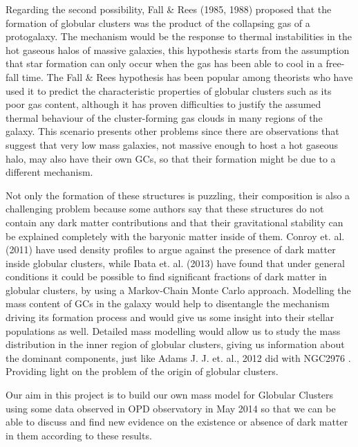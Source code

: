 Regarding the second possibility, Fall \& Rees (1985, 1988) proposed that the formation of globular clusters was the product of the collapsing gas of a protogalaxy. The mechanism would be the response to thermal instabilities in the hot gaseous halos of massive galaxies, this hypothesis starts from the assumption that star formation can only occur when the gas has been able to cool in a free-fall time. The Fall \& Rees hypothesis has been popular among theorists who have used it to predict the characteristic properties of globular clusters such as its poor gas content, although it has proven difficulties to justify the assumed thermal behaviour of the cluster-forming gas clouds in many regions of the galaxy. This scenario presents other problems since there are observations that suggest that very low mass galaxies, not massive enough to host a hot gaseous halo, may also have their own GCs, so that their formation might be due to a different mechanism.

Not only the formation of these structures is puzzling, their composition is also a challenging problem because some authors say that these structures do not contain any dark matter contributions and that their gravitational stability can be explained completely with the baryonic matter inside of them. Conroy et. al. (2011) have used density profiles to argue against the presence of dark matter inside globular clusters, while Ibata et. al. (2013) \cite{5} have found that under general conditions it could be possible to find significant fractions of dark matter in globular clusters, by using a Markov-Chain Monte Carlo approach. Modelling the mass content of GCs in the galaxy would help to disentangle the mechanism driving its formation process and would give us some insight into their stellar populations as well. Detailed mass modelling would allow us to study the mass distribution in the inner region of globular clusters, giving us information about the dominant components, just like Adams J. J. et. al., 2012 did with NGC2976 \cite{6}. Providing light on the problem of the origin of globular clusters.

Our aim in this project is to build our own mass model for Globular Clusters using some data observed in OPD observatory in May 2014 so that we can be able to discuss and find new evidence on the existence or absence of dark matter in them according to these results. 

